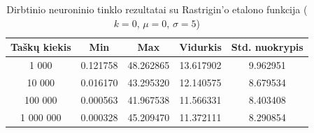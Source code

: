 \begin{table}[H]
    \centering
    \begin{tabular}{|c|c|c|c|c|}
        \hline
        \textbf{Taškų kiekis} & \textbf{Min} & \textbf{Max} & \textbf{Vidurkis} & \textbf{Std. nuokrypis} \\ \hline
        1 000        & 0.121758 & 48.262865 & 13.617902 & 9.962951 \\ \hline
        10 000       & 0.016170 & 43.295320 & 12.140575 & 8.679534 \\ \hline
        100 000      & 0.000563 & 41.967538 & 11.566331 & 8.403408 \\ \hline
        1 000 000    & 0.000328 & 45.209470 & 11.372111 & 8.290854 \\ \hline
    \end{tabular}
    \caption{Dirbtinio neuroninio tinklo rezultatai su Rastrigin'o etalono funkcija ($k = 0$, $\mu = 0$, $\sigma = 5$)}
\end{table}